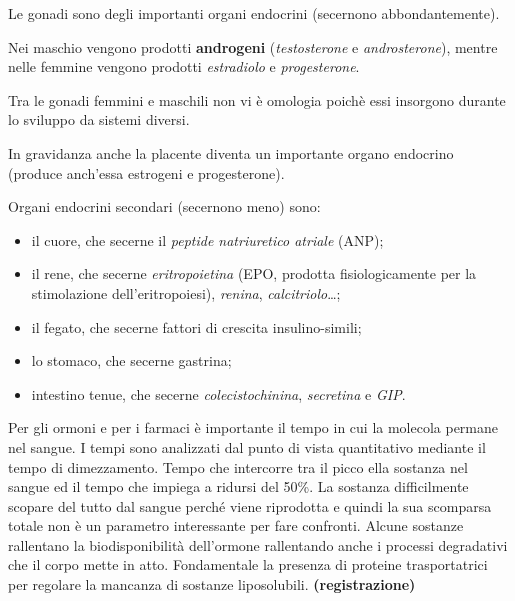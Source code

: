 \documentclass[]{article}
\begin{document}
Le gonadi sono degli importanti organi endocrini (secernono
abbondantemente).

Nei maschio vengono prodotti \textbf{androgeni} (\emph{testosterone} e
\emph{androsterone}), mentre nelle femmine vengono prodotti
\emph{estradiolo} e \emph{progesterone}.

Tra le gonadi femmini e maschili non vi è omologia poichè essi insorgono
durante lo sviluppo da sistemi diversi.

In gravidanza anche la placente diventa un importante organo endocrino
(produce anch'essa estrogeni e progesterone).

Organi endocrini secondari (secernono meno) sono:

\begin{itemize}
\itemsep1pt\parskip0pt
\item
  il cuore, che secerne il \emph{peptide natriuretico atriale} (ANP);
\item
  il rene, che secerne \emph{eritropoietina} (EPO, prodotta
  fisiologicamente per la stimolazione dell'eritropoiesi),
  \emph{renina}, \emph{calcitriolo}\ldots{};
\item
  il fegato, che secerne fattori di crescita insulino-simili;
\item
  lo stomaco, che secerne gastrina;
\item
  intestino tenue, che secerne \emph{colecistochinina}, \emph{secretina}
  e \emph{GIP}.
\end{itemize}

Per gli ormoni e per i farmaci è importante il tempo in cui la molecola
permane nel sangue. I tempi sono analizzati dal punto di vista
quantitativo mediante il tempo di dimezzamento. Tempo che intercorre tra
il picco ella sostanza nel sangue ed il tempo che impiega a ridursi del
50\%. La sostanza difficilmente scopare del tutto dal sangue perché
viene riprodotta e quindi la sua scomparsa totale non è un parametro
interessante per fare confronti. Alcune sostanze rallentano la
biodisponibilità dell'ormone rallentando anche i processi degradativi
che il corpo mette in atto. Fondamentale la presenza di proteine
trasportatrici per regolare la mancanza di sostanze liposolubili.
\textbf{(registrazione)}
\end{document}
